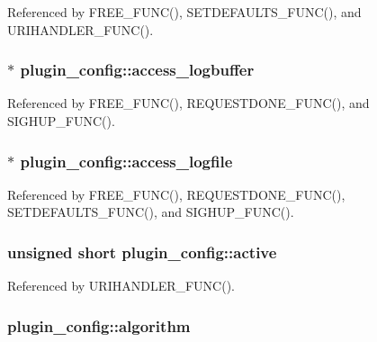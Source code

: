 Referenced by F\-R\-E\-E\-\_\-\-F\-U\-N\-C(), S\-E\-T\-D\-E\-F\-A\-U\-L\-T\-S\-\_\-\-F\-U\-N\-C(), and U\-R\-I\-H\-A\-N\-D\-L\-E\-R\-\_\-\-F\-U\-N\-C().

\hypertarget{structplugin__config_ac96f3c49710be2e36f04124164f3e68e}{
\subsubsection[{access\-\_\-logbuffer}]{$\ast$ plugin\-\_\-config\-::access\-\_\-logbuffer}}\label{structplugin__config_ac96f3c49710be2e36f04124164f3e68e}


Referenced by F\-R\-E\-E\-\_\-\-F\-U\-N\-C(), R\-E\-Q\-U\-E\-S\-T\-D\-O\-N\-E\-\_\-\-F\-U\-N\-C(), and S\-I\-G\-H\-U\-P\-\_\-\-F\-U\-N\-C().

\hypertarget{structplugin__config_a9f49dacad1547afc5c4f342e2785b890}{
\subsubsection[{access\-\_\-logfile}]{$\ast$ plugin\-\_\-config\-::access\-\_\-logfile}}\label{structplugin__config_a9f49dacad1547afc5c4f342e2785b890}


Referenced by F\-R\-E\-E\-\_\-\-F\-U\-N\-C(), R\-E\-Q\-U\-E\-S\-T\-D\-O\-N\-E\-\_\-\-F\-U\-N\-C(), S\-E\-T\-D\-E\-F\-A\-U\-L\-T\-S\-\_\-\-F\-U\-N\-C(), and S\-I\-G\-H\-U\-P\-\_\-\-F\-U\-N\-C().

\hypertarget{structplugin__config_ad1575f66f117a2ec733eb21beb5b94d1}{
\subsubsection[{active}]{\setlength{\rightskip}{0pt plus 5cm}unsigned short plugin\-\_\-config\-::active}}\label{structplugin__config_ad1575f66f117a2ec733eb21beb5b94d1}


Referenced by U\-R\-I\-H\-A\-N\-D\-L\-E\-R\-\_\-\-F\-U\-N\-C().

\hypertarget{structplugin__config_a0f25fd9fdfef8fd88970aa6bbc8d6245}{
\subsubsection[{algorithm}]{ plugin\-\_\-config\-::algorithm}}\label{structplugin__config_a0f25fd9fdfef8fd88970aa6bbc8d6245}


